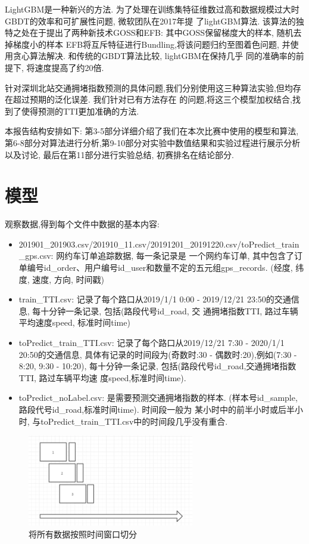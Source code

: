 \documentclass[a4paper,UTF8]{article}
\begin{document}
LightGBM是一种新兴的方法. 为了处理在训练集特征维数过高和数据规模过大时GBDT的效率和可扩展性问题, 微软团队在2017年提
了lightGBM算法\cite{ref3}. 该算法的独特之处在于提出了两种新技术GOSS和EFB: 其中GOSS保留梯度大的样本, 随机去掉梯度小的样本
EFB将互斥特征进行Bundling,将该问题归约至图着色问题, 并使用贪心算法解决. 和传统的GBDT算法比较, lightGBM在保持几乎
同的准确率的前提下, 将速度提高了约20倍. 

针对深圳北站交通拥堵指数预测的具体问题,我们分别使用这三种算法实验,但均存在超过预期的泛化误差. 我们针对已有方法存在
的问题,将这三个模型加权结合,找到了使得预测的TTI更加准确的方法. 

本报告结构安排如下: 第3-5部分详细介绍了我们在本次比赛中使用的模型和算法,
第6-8部分对算法进行分析,第9-10部分对实验中数值结果和实验过程进行展示分析以及讨论,
最后在第11部分进行实验总结, 初赛排名在结论部分. 

\section{模型}
观察数据,得到每个文件中数据的基本内容:
\begin{itemize}
	\item 201901\_201903.csv/201910\_11.csv/20191201\_20191220.csv/toPredict\_train\_gps.csv: 网约车订单追踪数据, 每一条记录是
	一个网约车订单, 其中包含了订单编号id\_order、用户编号id\_user和数量不定的五元组gps\_records. (经度, 纬度, 速度, 方向, 时间戳)
	\item train\_TTI.csv: 记录了每个路口从2019/1/1 0:00 - 2019/12/21 23:50的交通信息, 每十分钟一条记录, 包括(路段代号id\_road, 交
	通拥堵指数TTI, 路过车辆平均速度speed, 标准时间time)
	\item toPredict\_train\_TTI.csv: 记录了每个路口从2019/12/21 7:30 - 2020/1/1 20:50的交通信息, 具体有记录的时间段为(奇数时:30 -
	偶数时:20),例如(7:30 - 8:20, 9:30 - 10:20), 每十分钟一条记录, 包括(路段代号id\_road,交通拥堵指数TTI, 路过车辆平均速
	度speed,标准时间time).
	\item toPredict\_noLabel.csv: 是需要预测交通拥堵指数的样本. (样本号id\_sample, 路段代号id\_road,标准时间time). 时间段一般为
	某小时中的前半小时或后半小时, 与toPredict\_train\_TTI.csv中的时间段几乎没有重合. 
\end{itemize}

\begin{figure}[htbp]
	\centering
	\includegraphics[height=4cm]{time_window.png}
	\caption{将所有数据按照时间窗口切分}
\end{figure}
\end{document}
